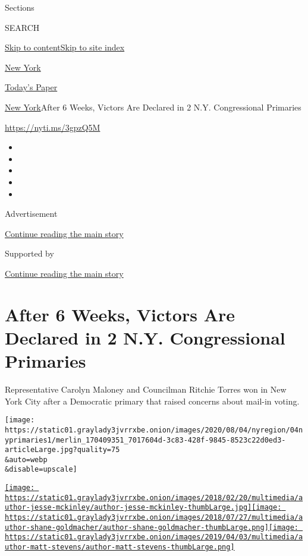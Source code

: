 Sections

SEARCH

\protect\hyperlink{site-content}{Skip to
content}\protect\hyperlink{site-index}{Skip to site index}

\href{https://www.nytimes3xbfgragh.onion/section/nyregion}{New York}

\href{https://myaccount.nytimes3xbfgragh.onion/auth/login?response_type=cookie\&client_id=vi}{}

\href{https://www.nytimes3xbfgragh.onion/section/todayspaper}{Today's
Paper}

\href{/section/nyregion}{New York}\textbar{}After 6 Weeks, Victors Are
Declared in 2 N.Y. Congressional Primaries

\href{https://nyti.ms/3gpzQ5M}{https://nyti.ms/3gpzQ5M}

\begin{itemize}
\item
\item
\item
\item
\item
\end{itemize}

Advertisement

\protect\hyperlink{after-top}{Continue reading the main story}

Supported by

\protect\hyperlink{after-sponsor}{Continue reading the main story}

\hypertarget{after-6-weeks-victors-are-declared-in-2-ny-congressional-primaries}{%
\section{After 6 Weeks, Victors Are Declared in 2 N.Y. Congressional
Primaries}\label{after-6-weeks-victors-are-declared-in-2-ny-congressional-primaries}}

Representative Carolyn Maloney and Councilman Ritchie Torres won in New
York City after a Democratic primary that raised concerns about mail-in
voting.

\texttt{[image: https://static01.graylady3jvrrxbe.onion/images/2020/08/04/nyregion/04nyprimaries1/merlin\_170409351\_7017604d-3c83-428f-9845-8523c22d0ed3-articleLarge.jpg?quality=75\\\&auto=webp\\\&disable=upscale]}

\href{https://www.nytimes3xbfgragh.onion/by/jesse-mckinley}{\texttt{[image: https://static01.graylady3jvrrxbe.onion/images/2018/02/20/multimedia/author-jesse-mckinley/author-jesse-mckinley-thumbLarge.jpg]}}\href{https://www.nytimes3xbfgragh.onion/by/shane-goldmacher}{\texttt{[image: https://static01.graylady3jvrrxbe.onion/images/2018/07/27/multimedia/author-shane-goldmacher/author-shane-goldmacher-thumbLarge.png]}}\href{https://www.nytimes3xbfgragh.onion/by/matt-stevens}{\texttt{[image: https://static01.graylady3jvrrxbe.onion/images/2019/04/03/multimedia/author-matt-stevens/author-matt-stevens-thumbLarge.png]}}

